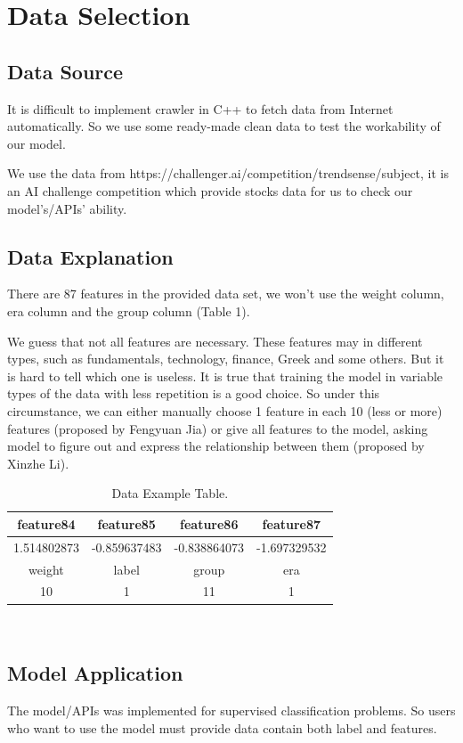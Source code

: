 \documentclass[a4paper]{article}
\begin{document}
\section{Data Selection}
\label{sec:theory}

\subsection{Data Source}
It is difficult to implement crawler in C++ to fetch data from Internet automatically. So we use some ready-made clean data to test the workability of our model. 


We use the data from https://challenger.ai/competition/trendsense/subject, it is an AI challenge competition which provide stocks data for us to check our model’s/APIs' ability.

\subsection{Data Explanation}

There are 87 features in the provided data set, we won’t use the weight column, era column and the group column (Table 1). 

We guess that not all features are necessary. These features may in different types, such as fundamentals, technology, finance, Greek and some others. But it is hard to tell which one is useless. It is true that training the model in variable types of the data with less repetition is a good choice. So under this circumstance, we can either manually choose 1 feature in each 10 (less or more) features (proposed by Fengyuan Jia) or give all features to the model, asking model to figure out and express the relationship between them (proposed by Xinzhe Li).    
\begin{table}[H]
\centering
\begin{tabular}{|c|c|c|c|}
 \hline
feature84& feature85& feature86& feature87 \\
 \hline
1.514802873 & -0.859637483 & -0.838864073 &-1.697329532  \\
 \hline
weight& label& group& era\\
  \hline
10 & 1&11&1\\
\hline
\end{tabular}\\
\caption{\label{tab:widgets}Data Example Table.}
\end{table}

\subsection{Model Application}
The model/APIs was implemented for supervised classification problems. So users who want to use the model must provide data contain both label and features. 
\end{document}
